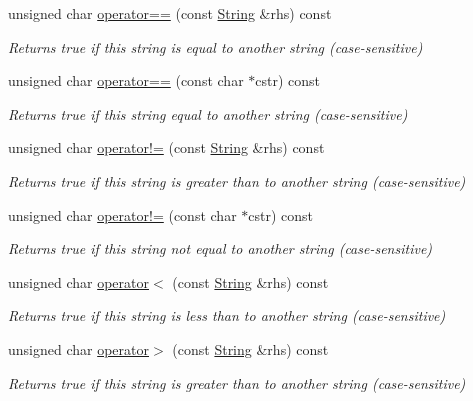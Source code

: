 \begin{DoxyCompactItemize}
unsigned char \hyperlink{class_string_a21388f8d52ccecd225db7d6724d3e38f}{operator==} (const \hyperlink{class_string}{String} \&rhs) const
\begin{DoxyCompactList}\small\item\em Returns true if this string is equal to another string (case-\/sensitive) \end{DoxyCompactList}\item 
unsigned char \hyperlink{class_string_ad453b9631caf5d0164ae493bf1aa9680}{operator==} (const char $\ast$cstr) const
\begin{DoxyCompactList}\small\item\em Returns true if this string equal to another string (case-\/sensitive) \end{DoxyCompactList}\item 
unsigned char \hyperlink{class_string_a4eda494a17ada57b9e8975c5b44b5227}{operator!=} (const \hyperlink{class_string}{String} \&rhs) const
\begin{DoxyCompactList}\small\item\em Returns true if this string is greater than to another string (case-\/sensitive) \end{DoxyCompactList}\item 
unsigned char \hyperlink{class_string_aa3bec091af9c137939b348138ae06e93}{operator!=} (const char $\ast$cstr) const
\begin{DoxyCompactList}\small\item\em Returns true if this string not equal to another string (case-\/sensitive) \end{DoxyCompactList}\item 
unsigned char \hyperlink{class_string_ae536c93957c3e2369a94bbdf99037681}{operator$<$} (const \hyperlink{class_string}{String} \&rhs) const
\begin{DoxyCompactList}\small\item\em Returns true if this string is less than to another string (case-\/sensitive) \end{DoxyCompactList}\item 
unsigned char \hyperlink{class_string_a25bbbdda663b6b0eb3ed3458e80fc66e}{operator$>$} (const \hyperlink{class_string}{String} \&rhs) const
\begin{DoxyCompactList}\small\item\em Returns true if this string is greater than to another string (case-\/sensitive) \end{DoxyCompactList}\item 

\end{DoxyCompactItemize}
